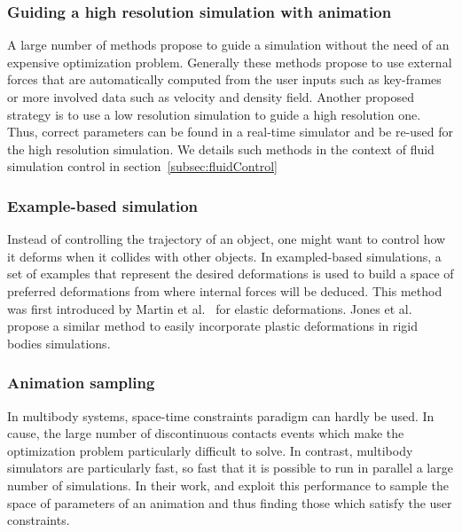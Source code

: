 \subsubsection{Guiding a high resolution simulation with animation}
A large number of methods propose to guide a simulation without the need of an expensive optimization problem. Generally these methods propose to use external forces that are automatically computed from the user inputs such as key-frames or more involved data such as velocity and density field. Another proposed strategy is to use a low resolution simulation to guide a high resolution one. Thus, correct parameters can be found in a real-time simulator and be re-used for the high resolution simulation.  We details such methods in the context of fluid simulation control in section~\ref{subsec:fluidControl}

\subsubsection{Example-based simulation}
Instead of controlling the trajectory of an object, one might want to control how it deforms when it collides with other objects. In exampled-based simulations, a set of examples that represent the desired deformations is used to build a space of preferred deformations from where internal forces will be deduced. This method was first introduced by Martin et al.~\cite{Martin2011} for elastic deformations. Jones et al.\cite{Jones2016} propose a similar method to easily incorporate plastic deformations in rigid bodies simulations.

\subsubsection{Animation sampling}
In multibody systems, space-time constraints paradigm can hardly be used. In cause, the large number of discontinuous contacts events which make the optimization problem particularly difficult to solve. In contrast, multibody simulators are particularly fast, so fast that it is possible to run in parallel a large number of simulations. In their work, \cite{Chenney2000} and \cite{Twigg2007} exploit this performance to sample the space of parameters of an animation and thus finding those which satisfy the user constraints.

